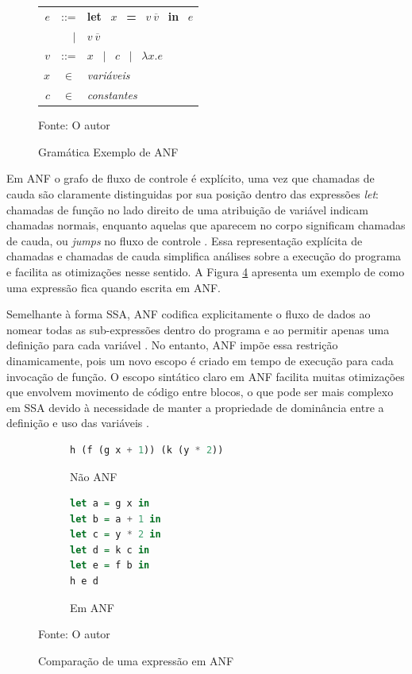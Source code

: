 \begin{figure}[h]
\begin{center}
\large
\begin{tabular}{r@{\ \ }c@{\ \ }l}
    $e$ & ::= & \textbf{let} \ $x$ \ \textbf{=} \ $v \ \overline{v}$ \ \textbf{in} \ $e$ \\
    & \ \ $|$ & $v \ \overline{v}$ \\
    $v$ & ::= & $x$ \ $|$ \ $c$ \ $|$ \ $\lambda x . e$ \\
    $x$ & $\in$ & \emph{variáveis} \\
    $c$ & $\in$ & \emph{constantes} \\
\end{tabular}
\caption{Gramática Exemplo de ANF}
\label{fig:llvm-ir-gramatica}
\small{Fonte: O autor}
\end{center}
\end{figure}

Em ANF o grafo de fluxo de controle é explícito, uma vez que chamadas de cauda são claramente distinguidas por sua posição dentro das expressões \emph{let}: chamadas de função no lado direito de uma atribuição de variável indicam chamadas normais, enquanto aquelas que aparecem no corpo significam chamadas de cauda, ou \emph{jumps} no fluxo de controle \cite{ssaToAnf}. Essa representação explícita de chamadas e chamadas de cauda simplifica análises sobre a execução do programa e facilita as otimizações nesse sentido. A Figura \ref{fig:lambda-vs-anf} apresenta um exemplo de como uma expressão fica quando escrita em ANF.

Semelhante à forma SSA, ANF codifica explicitamente o fluxo de dados ao nomear todas as sub-expressões dentro do programa e ao permitir apenas uma definição para cada variável \cite{ssaToAnf}. No entanto, ANF impõe essa restrição dinamicamente, pois um novo escopo é criado em tempo de execução para cada invocação de função. O escopo sintático claro em ANF facilita muitas otimizações que envolvem movimento de código entre blocos, o que pode ser mais complexo em SSA devido à necessidade de manter a propriedade de dominância entre a definição e uso das variáveis \cite{ssaToAnf}.

\begin{figure}[h]
\centering
\begin{subfigure}{.5\textwidth}
    \centering
    \begin{lstlisting}[language=Haskell,xleftmargin=.1\textwidth]
h (f (g x + 1)) (k (y * 2))
    \end{lstlisting}
    \caption{Não ANF}
    \label{fig:sub1}
\end{subfigure}%
\begin{subfigure}{.5\textwidth}
    \centering
    \begin{lstlisting}[language=Haskell,xleftmargin=.2\textwidth]
let a = g x in
let b = a + 1 in
let c = y * 2 in
let d = k c in
let e = f b in
h e d
    \end{lstlisting}
    \caption{Em ANF}
    \label{fig:sub2}
\end{subfigure}
\caption{Comparação de uma expressão em ANF}
\label{fig:lambda-vs-anf}
\small{Fonte: O autor}
\end{figure}

